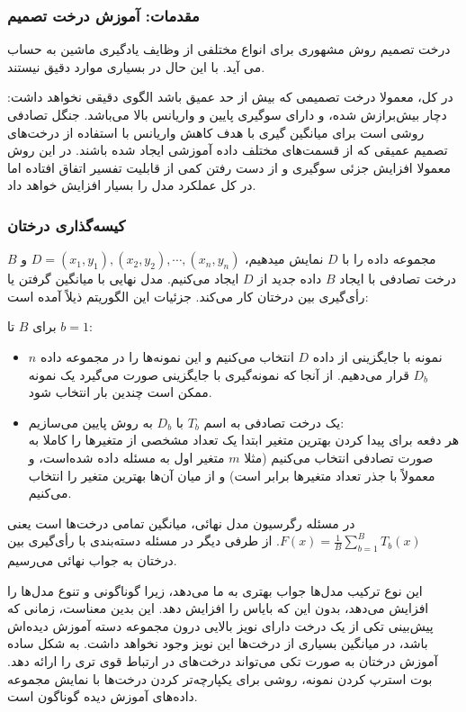\documentclass[12pt,a4paper,BCOR=.7cm,headsepline,bibliography=totoc]{report}
\begin{document}
\subsubsection{مقدمات: آموزش درخت تصمیم}
درخت تصمیم روش مشهوری برای انواع مختلفی از وظایف یادگیری ماشین به حساب می آید. با این حال در بسیاری موارد دقیق نیستند.

در کل، معمولا درخت تصمیمی که بیش از حد عمیق باشد الگوی دقیقی نخواهد داشت: دچار بیش‌برازش شده، و دارای سوگیری پایین و واریانس بالا می‌باشد. جنگل تصادفی روشی است برای میانگین گیری با هدف کاهش واریانس با استفاده از درخت‌های تصمیم عمیقی که از قسمت‌های مختلف داده آموزشی ایجاد شده باشند. در این روش معمولا افزایش جزئی سوگیری و از دست رفتن کمی از قابلیت تفسیر اتفاق افتاده اما در کل عملکرد مدل را بسیار افزایش خواهد داد.
\subsubsection{کیسه‌گذاری درختان}
مجموعه داده را با ${\displaystyle D}$ نمایش میدهیم، ${\displaystyle D=(x_{1},y_{1}),(x_{2},y_{2}),\cdots ,(x_{n},y_{n})}$ و ${\displaystyle B}$ درخت تصادفی با ایجاد ${\displaystyle B}$ داده جدید از ${\displaystyle D}$ ایجاد می‌کنیم. مدل نهایی با میانگین گرفتن یا رأی‌گیری بین درختان کار می‌کند. جزئیات این الگوریتم ذیلاً آمده است:‌

برای ${\displaystyle B}$ تا ${\displaystyle b=1}$:

\begin{itemize}
\item ${\displaystyle n}$
 نمونه با جایگزینی از داده ${\displaystyle D}$ انتخاب می‌کنیم و این نمونه‌ها را در مجموعه داده ${\displaystyle D_{b}}$ قرار می‌دهیم. از آنجا که نمونه‌گیری با جایگزینی صورت می‌گیرد یک نمونه ممکن است چندین بار انتخاب شود.
\item
 یک درخت تصادفی به اسم ${\displaystyle T_{b}}$ با ${\displaystyle D_{b}}$ به روش پایین می‌سازیم:\\
 هر دفعه برای پیدا کردن بهترین متغیر ابتدا یک تعداد مشخصی از متغیرها را کاملا به صورت تصادفی انتخاب می‌کنیم (مثلا ${\displaystyle m}$ متغیر اول به مسئله داده شده‌است، و معمولاً با جذر تعداد متغیرها برابر است) و از میان آن‌ها بهترین متغیر را انتخاب می‌کنیم.
\end{itemize}
در مسئله رگرسیون مدل نهائی، میانگین تمامی درخت‌ها است یعنی ${\displaystyle F(x)={\frac {1}{B}}\sum _{b=1}^{B}T_{b}(x)}$. از طرفی دیگر در مسئله دسته‌بندی با رأی‌گیری بین درختان به جواب نهائی می‌رسیم.

این نوع ترکیب مدل‌ها جواب بهتری به ما می‌دهد، زیرا گوناگونی و تنوع مدل‌ها را افزایش می‌دهد، بدون این که بایاس را افزایش دهد. این بدین معناست، زمانی که پیش‌بینی تکی از یک درخت دارای نویز بالایی درون مجموعه دسته آموزش دیده‌اش باشد، در میانگین بسیاری از درخت‌ها این نویز وجود نخواهد داشت. به شکل ساده آموزش درختان به صورت تکی می‌تواند درخت‌های در ارتباط قوی تری را ارائه دهد. بوت استرپ کردن نمونه، روشی برای یکپارچه‌تر کردن درخت‌ها با نمایش مجموعه داده‌های آموزش دیده گوناگون است.
\end{document}
